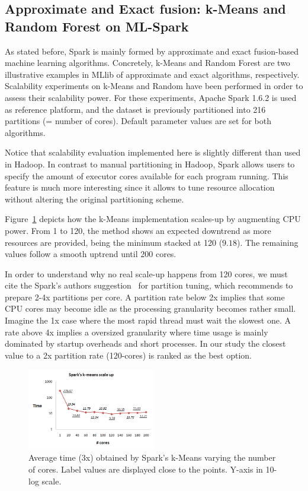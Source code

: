 \documentclass[3p,review]{elsarticle}
\begin{document}
\subsection{Approximate and Exact fusion: k-Means and Random Forest on ML-Spark}
\label{subsec:rfspark}

As stated before, Spark is mainly formed by approximate and exact fusion-based machine learning algorithms. Concretely, k-Means and Random Forest are two illustrative examples in MLlib of approximate and exact algorithms, respectively. Scalability experiments on k-Means and Random have been performed in order to assess their scalability power. For these experiments, Apache Spark 1.6.2 is used as reference platform, and the dataset is previously partitioned into 216 partitions (= number of cores). Default parameter values are set for both algorithms.

Notice that scalability evaluation implemented here is slightly different than used in Hadoop. In contrast to manual partitioning in Hadoop, Spark allows users to specify the amount of executor cores available for each program running. This feature is much more interesting since it allows to tune resource allocation without altering the original partitioning scheme.

Figure~\ref{fig:kmeans-spark} depicts how the k-Means implementation scales-up by augmenting CPU power. From 1 to 120, the method shows an expected downtrend as more resources are provided, being the minimum stacked at 120 ($9.18$). The remaining values follow a smooth uptrend until 200 cores. 

In order to understand why no real scale-up happens from 120 cores, we must cite the Spark's authors suggestion~\cite{mllibguide} for partition tuning, which recommends to prepare 2-4x partitions per core. A partition rate below 2x implies that some CPU cores may become idle as the processing granularity becomes rather small. Imagine the 1x case where the most rapid thread must wait the slowest one. A rate above 4x implies a oversized granularity where time usage is mainly dominated by startup overheads and short processes. In our study the closest value to a 2x partition rate (120-cores) is ranked as the best option. 

\begin{figure}[htp]
    \centering
    \includegraphics[width=0.5\textwidth]{kmeans-spark}
    \caption{Average time (3x) obtained by Spark's k-Means varying the number of cores. Label values are displayed close to the points. Y-axis in 10-log scale.}
    \label{fig:kmeans-spark}
\end{figure}
\end{document}
